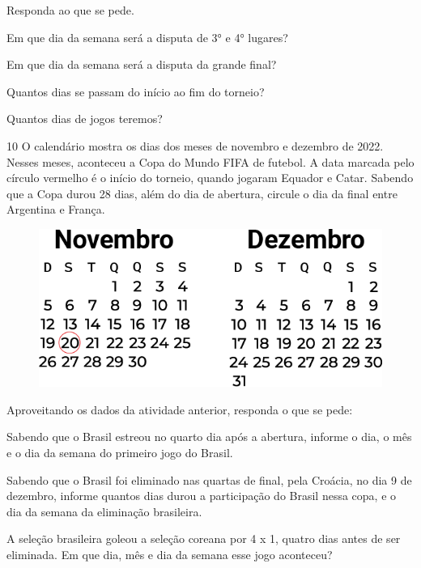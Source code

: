 Responda ao que se pede.

\begin{escolha}
\item Em que dia da semana será a disputa de 3° e 4° lugares?

\item Em que dia da semana será a disputa da grande final?

\item Quantos dias se passam do início ao fim do torneio?

\item Quantos dias de jogos teremos?
\end{escolha}

\pagebreak
\num{10} O calendário mostra os dias dos meses de novembro e dezembro de
2022. Nesses meses, aconteceu a Copa do Mundo FIFA de futebol. A data
marcada pelo círculo vermelho é o início do torneio, quando jogaram
Equador e Catar. Sabendo que a Copa durou 28 dias, além do dia de abertura, circule o dia da
final entre Argentina e França.


\begin{figure}[htpb!]
\includegraphics[width=\textwidth]{./media/image59.png}
\end{figure}

Aproveitando os dados da atividade anterior, responda o que se pede:

\begin{escolha}
\item Sabendo que o Brasil estreou no quarto dia após a abertura, informe o dia, o
  mês e o dia da semana do primeiro jogo do Brasil.

\item Sabendo que o Brasil foi eliminado nas quartas de final, pela Croácia,
  no dia 9 de dezembro, informe quantos dias durou a participação do
  Brasil nessa copa, e o dia da semana da eliminação brasileira.

\item A seleção brasileira goleou a seleção coreana por 4 x 1, quatro dias
  antes de ser eliminada. Em que dia, mês e dia da semana esse jogo
  aconteceu?
\end{escolha}

